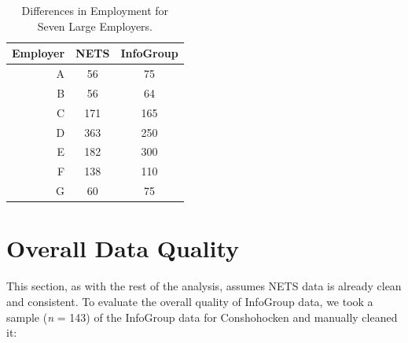 \documentclass[paper = letter, fontsize = 11pt]{scrartcl}
\begin{document}
\begin{table}[h]
	\begin{center}
		\begin{tabular}{ r | c c }
			Employer & NETS & InfoGroup \\
			\hline
			\hline
			A & 56 & 75 \\
			\hline 
			B & 56 & 64 \\
			\hline 
			C & 171 & 165 \\
			\hline
			D & 363 & 250 \\
			\hline 
			E & 182 & 300 \\
			\hline 
			F & 138 & 110 \\
			\hline 
			G & 60 & 75 \\
			\hline
		\end{tabular}
	\end{center}
	\caption{Differences in Employment for Seven Large Employers.}
\end{table}
\section{Overall Data Quality}
This section, as with the rest of the analysis, assumes NETS data is already clean and consistent. To evaluate the overall quality of InfoGroup data, we took a sample (\textit{n} = 143) of the InfoGroup data for Conshohocken and manually cleaned it:
\end{document}
